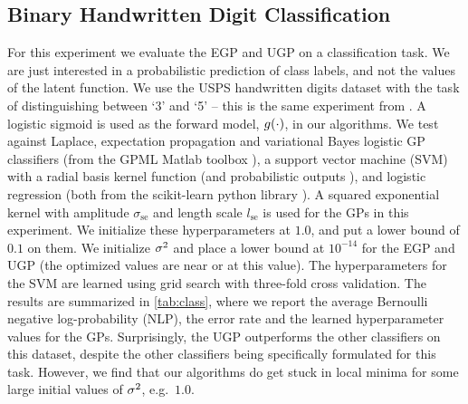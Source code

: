 \documentclass{article} %
\begin{document}
\subsection{Binary Handwritten Digit Classification}

For this experiment we evaluate the EGP and UGP on a classification task. We
are just interested in a probabilistic prediction of class labels, and not the
values of the latent function. We use the USPS handwritten digits dataset with
the task of distinguishing between `3' and `5' -- this is the same experiment
from \cite[\S 3.7.3]{Rasmussen2006}. A logistic sigmoid is used as the forward
model, $g\!\left({{\cdot}}\right)$, in our algorithms. We test against Laplace,
expectation propagation and variational Bayes logistic GP classifiers (from the
GPML Matlab toolbox \cite{Rasmussen2006}), a support vector machine (SVM) with
a radial basis kernel function (and probabilistic outputs \cite{Platt1999}),
and logistic regression (both from the scikit-learn python library
\cite{scikit-learn}). A squared exponential kernel with amplitude
$\sigma_\text{se}$ and length scale $l_\text{se}$ is used for the GPs in this
experiment. We initialize these hyperparameters at $1.0$, and put a lower bound
of $0.1$ on them. We initialize $\sigma^2$ and place a lower bound at $10^{-14}$
for the EGP and UGP (the optimized values are near or at this value). The
hyperparameters for the SVM are learned using grid search with three-fold cross
validation. 
%
%
The results are summarized in \autoref{tab:class}, where we report the average
Bernoulli negative log-probability (NLP), the error rate and the learned
hyperparameter values for the GPs. Surprisingly, the UGP outperforms the other
classifiers on this dataset, despite the other classifiers being specifically
formulated for this task. However, we find that our algorithms do get stuck in
local minima for some large initial values of $\sigma^2$, e.g.~$1.0$.
\end{document}
